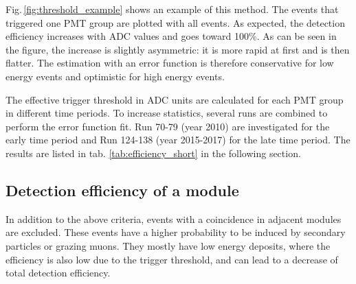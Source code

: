Fig.\,\ref{fig:threshold_example} shows an example of this method. The events that triggered one PMT group are plotted with all events. As expected, the detection efficiency increases with ADC values and goes toward 100\%. As can be seen in the figure, the increase is slightly asymmetric: it is more rapid at first and is then flatter. The estimation with an error function is therefore conservative for low energy events and optimistic for high energy events.

The effective trigger threshold in ADC units are calculated for each PMT group in different time periods. To increase statistics, several runs are combined to perform the error function fit. Run 70-79 (year 2010) are investigated for the early time period and Run 124-138 (year 2015-2017) for the late time period. The results are listed in tab. \ref{tab:efficiency_short} in the following section.


\subsection{Detection efficiency of a module}
In addition to the above criteria, events with a coincidence in adjacent modules are excluded. These events have a higher probability to be induced by secondary particles or grazing muons. They mostly have low energy deposits, where the efficiency is also low due to the trigger threshold, and can lead to a decrease of total detection efficiency.


